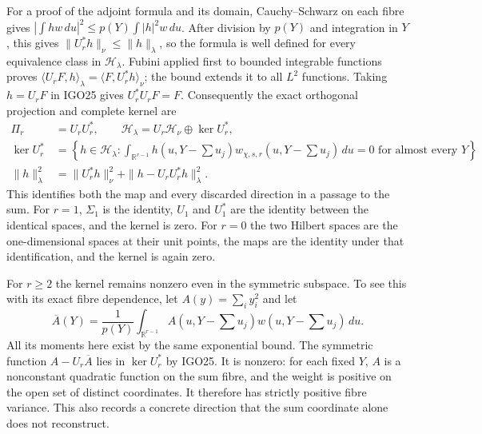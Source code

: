 \documentclass[11pt,a4paper]{article}
\begin{document}
For a proof of the adjoint formula and its domain, Cauchy--Schwarz
on each fibre gives
$|\int hw\,du|^2\leq p(Y)\int|h|^2w\,du$.
After division by $p(Y)$ and integration in $Y$, this gives
$\|U_r^*h\|_{\nu}\leq\|h\|_{\lambda}$, so the formula is
well defined for every equivalence class in $\mathcal H_\lambda$.
Fubini applied first to bounded integrable functions proves
$\langle U_rF,h\rangle_\lambda=\langle F,U_r^*h\rangle_\nu$;
the bound extends it to all $L^2$ functions. Taking $h=U_rF$
in IGO25 gives $U_r^*U_rF=F$. Consequently the exact orthogonal
projection and complete kernel are
\[
 \begin{split}
 \Pi_r&=U_rU_r^*,\qquad
 \mathcal H_\lambda=U_r\mathcal H_\nu\mathbin{\oplus}\ker U_r^*,\\
 \ker U_r^*&=\left\{h\in\mathcal H_\lambda:
    \int_{\mathbb R^{r-1}}h(u,Y-\textstyle\sum u_j)
     w_{\chi,s,r}(u,Y-\textstyle\sum u_j)\,du=0
      \text{ for almost every }Y\right\},\\
 \|h\|_\lambda^2&=\|U_r^*h\|_\nu^2+
                   \|h-U_rU_r^*h\|_\lambda^2.
 \end{split}
 \tag{IGO26}
\]
This identifies both the map and every discarded direction
in a passage to the sum. For $r=1$, $\Sigma_1$ is the identity,
$U_1$ and $U_1^*$ are the identity between the identical spaces,
and the kernel is zero. For $r=0$ the two Hilbert spaces are
the one-dimensional spaces at their unit points, the maps
are the identity under that identification, and the kernel
is again zero.

For $r\geq2$ the kernel remains nonzero even in the symmetric
subspace. To see this with its exact fibre dependence, let
$A(y)=\sum_i y_i^2$ and let
\[
 \overline A(Y)=\frac{1}{p(Y)}
     \int_{\mathbb R^{r-1}}A(u,Y-\textstyle\sum u_j)
                 w(u,Y-\textstyle\sum u_j)\,du.
\]
All its moments here exist by the same exponential bound.
The symmetric function $A-U_r\overline A$ lies in
$\ker U_r^*$ by IGO25. It is nonzero: for each fixed $Y$,
$A$ is a nonconstant quadratic function on the sum fibre,
and the weight is positive on the open set of distinct
coordinates. It therefore has strictly positive fibre
variance. This also records a concrete direction that the
sum coordinate alone does not reconstruct.
\end{document}
